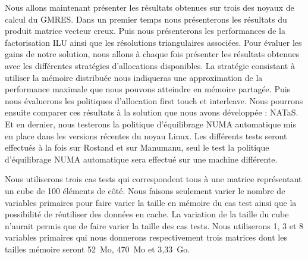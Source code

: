 Nous allons maintenant présenter les résultats obtenues sur trois des noyaux de calcul du GMRES.
%
Dans un premier temps nous présenterons les résultats du produit matrice vecteur creux.
%
Puis nous présenterons les performances de la factorisation ILU ainsi que les résolutions triangulaires associées.
%
Pour évaluer les gains de notre solution, nous allons à chaque fois présenter les résultats obtenues avec les différentes stratégies d'allocations disponibles.
%
La stratégie consistant à utiliser la mémoire distribuée nous indiqueras une approximation de la performance maximale que nous pouvons atteindre en mémoire partagée.
%
Puis nous évaluerons les politiques d'allocation first touch et interleave.
%
Nous pourrons ensuite comparer ces résultats à la solution que nous avons développée : NATaS.
%
Et en dernier, nous testerons la politique d'équilibrage NUMA automatique mis en place dans les versions récentes du noyau Linux.
%
Les différents tests seront effectués à la fois sur Rostand et sur Manumanu, seul le test la politique d'équilibrage NUMA automatique sera effectué sur une machine différente.


Nous utiliserons trois cas tests qui correspondent tous à une matrice représentant un cube de 100 éléments de côté.
%
Nous faisons seulement varier le nombre de variables primaires pour faire varier la taille en mémoire du cas test ainsi que la possibilité de réutiliser des données en cache.
%
La variation de la taille du cube n'aurait permis que de faire varier la taille des cas tests.
%
Nous utiliserons 1, 3 et 8 variables primaires qui nous donnerons respectivement trois matrices dont les tailles mémoire seront 52~Mo, 470~Mo et 3,33~Go.
